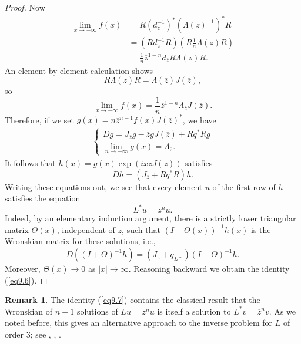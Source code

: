 \documentclass{surv-l}
\theoremstyle{plain}
\theoremstyle{definition}
\newtheorem{remark}[theorem]{Remark}
\numberwithin{equation}{chapter}
\begin{document}
\begin{proof}
Now
\begin{align*}
\lim_{x\rightarrow-\infty} f(x)& = R(d_{z}^{-1})^{*}(\Lambda(z)^{-1})^{*}R\\
&= (Rd_{\overline{z}}^{-1}R)(R\tfrac{1}{n}\Lambda(z)R)\\
&= \frac{1}{n}\overline{z}^{1-n}d_{\overline{z}}R\Lambda(z)R.
\end{align*}
An element-by-element calculation shows
\begin{equation}\label{eq9.13}
R\Lambda(z)R=\Lambda(\overline{z})J(\overline{z}),
\end{equation}
so
\begin{equation*}
\lim_{x\rightarrow-\infty}f(x) = \frac{1}{n}\overline{z}^{1-n}\Lambda_{\overline{z}}J(\overline{z}).
\end{equation*}
Therefore, if we set $g(x)=n\overline{z}^{n-1}f(x)J(\overline{z})^{*}$, we have
\begin{align}\label{eq9.14}
\left\{\begin{array}{ll}
Dg = J_{\overline{z}}g-\overline{z}gJ(\overline{z}) + Rq^{*} Rg\\
\lim_{n\rightarrow-\infty}g(x) = \Lambda_{\overline{z}}.
\end{array}\right.
\end{align}
It follows that $h(x)=g(x)\exp(ix\overline{z}J(\overline{z}))$ satisfies
\begin{equation}\label{eq9.15}
Dh=(J_{\overline{z}}+Rq^{*}R)h.
\end{equation}
Writing these equations out, we see that every element $u$ of the first row of $h$ satisfies the equation
\begin{equation*}
L^{*}u=\overline{z}^{n}u.
\end{equation*}
Indeed, by an elementary induction argument, there is a strictly lower triangular matrix $\Theta(x)$, independent of $z$, such that $(I+\Theta(x))^{-1}h(x)$ is the Wronskian matrix for these solutions, i.e.,
\begin{equation*}
D((I+\Theta)^{-1}h)=(J_{\overline{z}}+q_{{L}{*}})(I+\Theta)^{-1}h.
\end{equation*}
Moreover, $\Theta(x)\rightarrow 0$ as $|x|\rightarrow\infty$. Reasoning backward we obtain the identity (\ref{eq9.6}).
\end{proof}
\setcounter{theorem}{15}
\begin{remark}\label{rem9.16} The identity (\ref{eq9.7}) contains the classical result that the Wronskian of $n-1$ solutions of $Lu=z^{n}u$ is itself a solution to $L^{*}v=\overline{z}^{n}v$. As we noted before, this gives an alternative approach to the inverse problem for $L$ of order 3; see \cite{Ka}, \cite{McK}, \cite{DTT}.
\end{remark}
\end{document}

